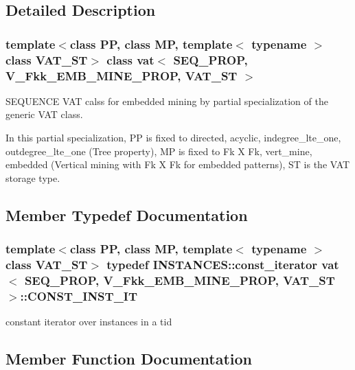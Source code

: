 \subsection{Detailed Description}
\subsubsection*{template$<$class PP, class MP, template$<$ typename $>$ class VAT\_\-ST$>$ class vat$<$ SEQ\_\-PROP, V\_\-Fkk\_\-EMB\_\-MINE\_\-PROP, VAT\_\-ST $>$}

SEQUENCE VAT calss for embedded mining by partial specialization of the generic VAT class. 

In this partial specialization, PP is fixed to directed, acyclic, indegree\_\-lte\_\-one, outdegree\_\-lte\_\-one (Tree property), MP is fixed to Fk X Fk, vert\_\-mine, embedded (Vertical mining with Fk X Fk for embedded patterns), ST is the VAT storage type. 



\subsection{Member Typedef Documentation}
\subsubsection{\setlength{\rightskip}{0pt plus 5cm}template$<$class PP, class MP, template$<$ typename $>$ class VAT\_\-ST$>$ typedef INSTANCES::const\_\-iterator {\bf vat}$<$ SEQ\_\-PROP, V\_\-Fkk\_\-EMB\_\-MINE\_\-PROP, VAT\_\-ST $>$::{\bf CONST\_\-INST\_\-IT}}\label{classvat_3_01SEQ__PROP_00_01V__Fkk__EMB__MINE__PROP_00_01VAT__ST_01_4_w7}


constant iterator over instances in a tid 

\subsection{Member Function Documentation}
